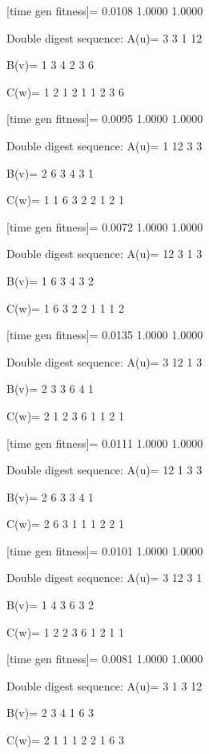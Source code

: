 [time gen fitness]=
    0.0108    1.0000    1.0000

Double digest sequence:
A(u)=
     3     3     1    12

B(v)=
     1     3     4     2     3     6

C(w)=
     1     2     1     2     1     1     2     3     6

[time gen fitness]=
    0.0095    1.0000    1.0000

Double digest sequence:
A(u)=
     1    12     3     3

B(v)=
     2     6     3     4     3     1

C(w)=
     1     1     6     3     2     2     1     2     1

[time gen fitness]=
    0.0072    1.0000    1.0000

Double digest sequence:
A(u)=
    12     3     1     3

B(v)=
     1     6     3     4     3     2

C(w)=
     1     6     3     2     2     1     1     1     2

[time gen fitness]=
    0.0135    1.0000    1.0000

Double digest sequence:
A(u)=
     3    12     1     3

B(v)=
     2     3     3     6     4     1

C(w)=
     2     1     2     3     6     1     1     2     1

[time gen fitness]=
    0.0111    1.0000    1.0000

Double digest sequence:
A(u)=
    12     1     3     3

B(v)=
     2     6     3     3     4     1

C(w)=
     2     6     3     1     1     1     2     2     1

[time gen fitness]=
    0.0101    1.0000    1.0000

Double digest sequence:
A(u)=
     3    12     3     1

B(v)=
     1     4     3     6     3     2

C(w)=
     1     2     2     3     6     1     2     1     1

[time gen fitness]=
    0.0081    1.0000    1.0000

Double digest sequence:
A(u)=
     3     1     3    12

B(v)=
     2     3     4     1     6     3

C(w)=
     2     1     1     1     2     2     1     6     3

